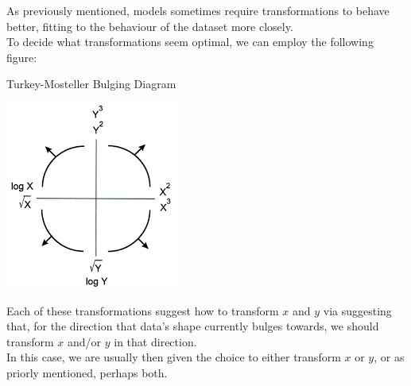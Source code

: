 As previously mentioned, models sometimes require transformations to behave better, fitting to the behaviour of the dataset more closely. \\
To decide what transformations seem optimal, we can employ the following figure:
\begin{ln-fig}{Turkey-Mosteller Bulging Diagram}{}
    \begin{center}
        \includegraphics[scale=0.8]{figs/ln02/turkey-mosteller.png}
    \end{center}
\end{ln-fig}
Each of these transformations suggest how to transform $x$ and $y$ via suggesting that, for the direction that data's shape currently bulges towards, we should transform $x$ and/or $y$ in that direction. \\
In this case, we are usually then given the choice to either transform $x$ or $y$, or as priorly mentioned, perhaps both.
